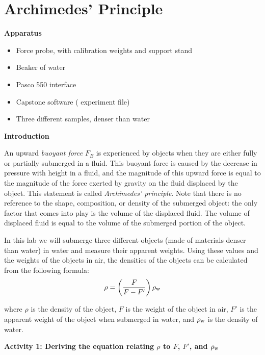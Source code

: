 \section{Archimedes' Principle}

\makelabheader %


\bigskip
\textbf{Apparatus}

\begin{itemize}[nosep]
\item Force probe, with calibration weights and support stand
\item Beaker of water
\item Pasco 550 interface
\item Capstone software ( experiment file)
\item Three different samples, denser than water
\end{itemize}

\bigskip
\textbf{Introduction}

An upward \textit{buoyant force} $F_B$ is experienced by objects when they are either fully or partially submerged in a fluid. This buoyant force is caused by the decrease in pressure with height in a fluid, and the magnitude of this upward force is equal to the magnitude of the force exerted by gravity on the fluid displaced by the object. 
This statement is called \textit{Archimedes' principle}. Note that there is no reference to the shape, composition, or density of the submerged object: the only factor that comes into play is the volume of the displaced fluid. 
The volume of displaced fluid is equal to the volume of the submerged portion of the object.

In this lab we will submerge three different objects (made of materials denser than water) in water and measure their apparent weights. Using these values and the weights of the objects in air, the densities of the objects can be calculated from the following formula:
\begin{equation}
\rho = \left( \frac{F}{F-F'}\right)\rho_{\rm w}
\label{equation_archimedes_density}
\end{equation}

where $\rho$ is the density of the object, $F$ is the weight of the object in air, $F'$ is the apparent weight of the object when submerged in water, and $\rho_{\rm w}$ is the density of water.

\bigskip
\textbf{Activity 1: Deriving the equation relating $\rho$ to $F$, $F'$, and $\rho_{\rm w}$}

